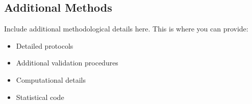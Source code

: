     
\subsection{Additional Methods}

Include additional methodological details here. This is where you can provide:
\begin{itemize}
\item Detailed protocols
\item Additional validation procedures
\item Computational details
\item Statistical code
\end{itemize}

